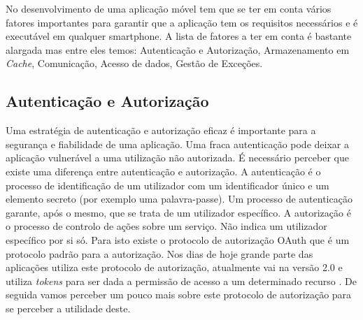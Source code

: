 No desenvolvimento de uma aplicação móvel tem que se ter em conta vários fatores importantes para garantir que a aplicação tem os requisitos necessários e é executável em qualquer smartphone. A lista de fatores a ter em conta é bastante alargada mas entre eles temos: Autenticação e Autorização, Armazenamento em \textit{Cache}, Comunicação, Acesso de dados, Gestão de Exceções. \cite{mobileappbook}


\subsection{Autenticação e Autorização}
Uma estratégia de autenticação e autorização eficaz é importante para a segurança e fiabilidade de uma aplicação. Uma fraca autenticação pode deixar a aplicação vulnerável a uma utilização não autorizada. É necessário perceber que existe uma diferença entre autenticação e autorização. A autenticação é o processo de identificação de um utilizador com um identificador único e um elemento secreto (por exemplo uma palavra-passe). Um processo de autenticação garante, após o mesmo, que se trata de um utilizador específico. A autorização é o processo de controlo de ações sobre um serviço. Não indica um utilizador específico por si só. Para isto existe o protocolo de autorização OAuth que é um protocolo padrão para a autorização. Nos dias de hoje grande parte das aplicações utiliza este protocolo de autorização, atualmente vai na versão 2.0 e utiliza \textit{tokens} para ser dada a permissão de acesso a um determinado recurso \cite{oauth20}. De seguida vamos perceber um pouco mais sobre este protocolo de autorização para se perceber a utilidade deste.


